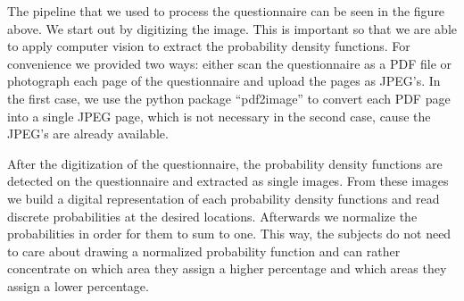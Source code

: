 \documentclass[../main/main.tex]{subfiles}
\begin{document}
\begin{center}
	\end{center}

	\newpage

	The pipeline that we used to process the questionnaire can be seen in the figure above. We start out by digitizing the image. This is important so that we are able to apply computer vision to extract the probability density functions. For convenience we provided two ways: either scan the questionnaire as a PDF file or photograph each page of the questionnaire and upload the pages as JPEG's. In the first case, we use the python package ``pdf2image'' to convert each PDF page into a single JPEG page, which is not necessary in the second case, cause the JPEG's are already available.  

	After the digitization of the questionnaire, the probability density functions are detected on the questionnaire and extracted as single images. From these images we build a digital representation of each probability density functions and read discrete probabilities at the desired locations. Afterwards we normalize the probabilities in order for them to sum to one. This way, the subjects do not need to care about drawing a normalized probability function and can rather concentrate on which area they assign a higher percentage and which areas they assign a lower percentage. 
	
\end{document}
